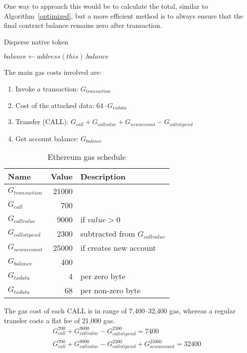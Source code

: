 \documentclass[12pt]{article}
\begin{document}
One way to approach this would be to calculate the total, similar to Algorithm~\ref{optimized}, but a more efficient method is to always ensure that the final contract balance remains zero after transaction.

\begin{algorithm}[h]
	\label{native}
	\caption{Disperse native token}
	\BlankLine
	\For{$i \in [0 \dots recipients.length)$}{
		recipients[i].transfer(values[i])
	}
	$balance \leftarrow address(this).balance$ \\
\end{algorithm}

The main gas costs involved are:
\begin{enumerate}
	\item Invoke a transaction: $G_{transaction}$
	\item Cost of the attached data: $64 \cdot G_{txdata}$
	\item Transfer (CALL): $G_{call} + G_{callvalue} + G_{newaccount} - G_{callstipend}$
	\item Get account balance: $G_{balance}$
\end{enumerate}

\begin{table}[h]
\caption{Ethereum gas schedule}
\label{gas-costs-2}
\begin{center}
\begin{tabular}{l r l}
	Name & Value & Description \\ \hline
	$G_{transaction}$ & 21000 \\
	$G_{call}$ & 700 \\
	$G_{callvalue}$ & 9000 & if $value > 0$ \\
	$G_{callstipend}$ & 2300 & subtracted from $G_{callvalue}$ \\
	$G_{newaccount}$ & 25000 & if creates new account \\
	$G_{balance}$ & 400 \\
	$G_{txdata}$ & 4 & per zero byte \\
	$G_{txdata}$ & 68 & per non-zero byte \\

\end{tabular}
\end{center}
\end{table}

The gas cost of each CALL\cite{subtleties} is in range of 7,400--32,400 gas, whereas a regular transfer costs a flat fee of 21,000 gas.
%
\begin{gather}
G_{call}^{700} + G_{callvalue}^{9000} - G_{callstipend}^{2300} = 7400 \\
G_{call}^{700} + G_{callvalue}^{9000} - G_{callstipend}^{2300} + G_{newaccount}^{25000} = 32400
\end{gather}
\end{document}
